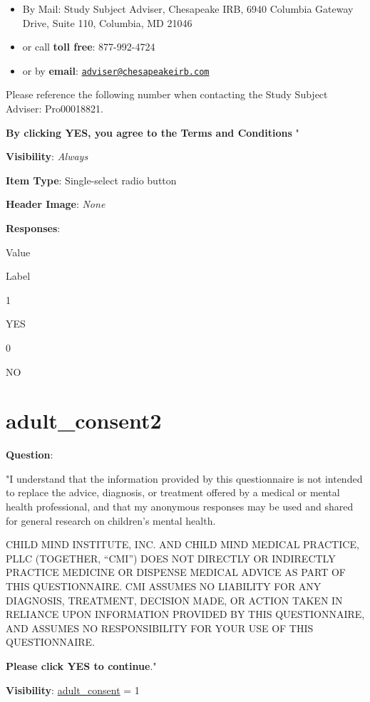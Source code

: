 \documentclass[]{book}
\begin{document}
\begin{itemize}
\item
  By Mail: Study Subject Adviser, Chesapeake IRB, 6940 Columbia Gateway Drive, Suite 110, Columbia, MD 21046
\item
  or call \textbf{toll free}: 877-992-4724
\item
  or by \textbf{email}: \href{mailto:adviser@chesapeakeirb.com}{\nolinkurl{adviser@chesapeakeirb.com}}
\end{itemize}

Please reference the following number when contacting the Study Subject Adviser: Pro00018821.

\textbf{By clicking YES, you agree to the Terms and Conditions }"

\textbf{Visibility}: \emph{Always}

\textbf{Item Type}: Single-select radio button

\textbf{Header Image}: \emph{None}

\textbf{Responses}:

Value

Label

1

YES

0

NO

\hypertarget{adult_consent2}{%
\section{adult\_consent2}\label{adult_consent2}}

\textbf{Question}:

"I understand that the information provided by this questionnaire is not intended to replace the advice, diagnosis, or treatment offered by a medical or mental health professional, and that my anonymous responses may be used and shared for general research on children's mental health.

CHILD MIND INSTITUTE, INC. AND CHILD MIND MEDICAL PRACTICE, PLLC (TOGETHER, ``CMI'') DOES NOT DIRECTLY OR INDIRECTLY PRACTICE MEDICINE OR DISPENSE MEDICAL ADVICE AS PART OF THIS QUESTIONNAIRE. CMI ASSUMES NO LIABILITY FOR ANY DIAGNOSIS, TREATMENT, DECISION MADE, OR ACTION TAKEN IN RELIANCE UPON INFORMATION PROVIDED BY THIS QUESTIONNAIRE, AND ASSUMES NO RESPONSIBILITY FOR YOUR USE OF THIS QUESTIONNAIRE.

\textbf{Please click YES to continue}."

\textbf{Visibility}: \protect\hyperlink{adult_consent}{adult\_consent} = 1
\end{document}
